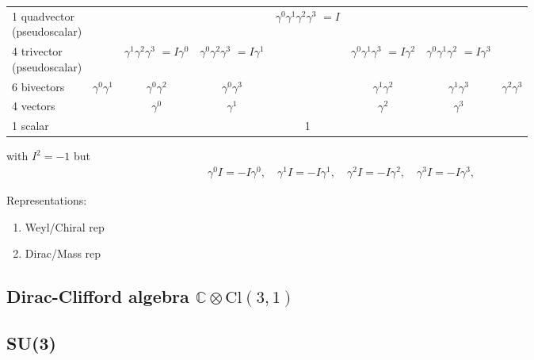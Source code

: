 \documentclass[../main.tex]{subfiles}
\begin{document}
\begin{itemize}
\begin{itemize}
\begin{center}
\begin{table}[!h]
\begin{tcolorbox}
\begin{tabular}{lccccccc}
\shortstack{1 quadvector\\ (pseudoscalar)} &&&&\shortstack{$\gamma^0\gamma^1\gamma^2\gamma^3$\\$=I$} &\\
\shortstack{4 trivector\\ (pseudoscalar)} &&
 \shortstack{$\gamma^1\gamma^2\gamma^3$\\$=I\gamma^0$} &
 \shortstack{$\gamma^0\gamma^2\gamma^3$\\$=I\gamma^1$} && 
\shortstack{$\gamma^0\gamma^1\gamma^3$\\$=I\gamma^2$}  &
\shortstack{$\gamma^0\gamma^1\gamma^2$\\$=I\gamma^3$} \\
6 bivectors &$\gamma^0\gamma^1$&$\gamma^0\gamma^2$&$\gamma^0\gamma^3$&&$\gamma^1\gamma^2$&$\gamma^1\gamma^3$&$\gamma^2\gamma^3$\\
4 vectors & &$\gamma^0$&$\gamma^1$&&$\gamma^2$&$\gamma^3$\\
1 scalar &&& & 1
\end{tabular}
\end{tcolorbox}
\end{table}
\end{center}
with $I^2=-1$ but
\begin{align}
\gamma^0I=-I\gamma^0,\quad
\gamma^1I=-I\gamma^1,\quad
\gamma^2I=-I\gamma^2,\quad
\gamma^3I=-I\gamma^3,\quad
\end{align}
\end{itemize}
 Representations:
\begin{enumerate}
\item Weyl/Chiral rep
\item Dirac/Mass rep
\end{enumerate}



\subsection{Dirac-Clifford algebra $\mathbb{C}\otimes\text{Cl}(3,1)$}

\subsection{SU(3)}


\end{itemize}
\end{document}
